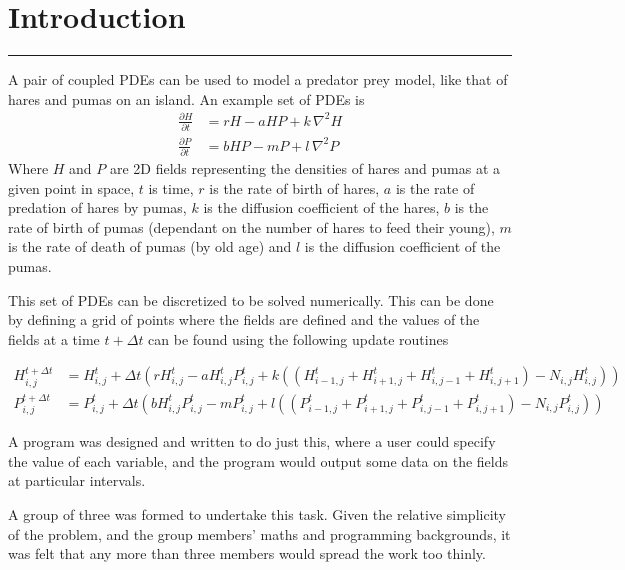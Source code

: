 \section{Introduction}
\vspace{-2em}\rule{\textwidth}{1pt}\vspace{1em}

A pair of coupled PDEs can be used to model a predator prey model, like
that of hares and pumas on an island.
An example set of PDEs is
\begin{align*}
  \frac{\partial{H}}{\partial{t}} &= rH - aHP + k\,{\nabla^2}H \\
  \frac{\partial{P}}{\partial{t}} &= bHP - mP + l\,{\nabla^2}P
\end{align*}
Where $H$ and $P$ are 2D fields representing the densities of hares and pumas
at a given point in space,
$t$ is time,
$r$ is the rate of birth of hares,
$a$ is the rate of predation of hares by pumas,
$k$ is the diffusion coefficient of the hares,
$b$ is the rate of birth of pumas (dependant on the number of hares to
    feed their young),
$m$ is the rate of death of pumas (by old age) and
$l$ is the diffusion coefficient of the pumas.

This set of PDEs can be discretized to be solved numerically.
This can be done by defining a grid of points where the fields are
defined and the values of the fields at a time $t + \Delta{t}$ can
be found using the following update routines

\begin{align*}
  H^{t+\Delta{t}}_{i,j} &= H^{t}_{i,j}
       + \Delta{t}(
           rH^{t}_{i,j} - a H^{t}_{i,j} P^{t}_{i,j}
           + k (
             (H^{t}_{i-1,j} + H^{t}_{i+1,j} + H^{t}_{i,j-1} + H^{t}_{i,j+1})
             -N_{i,j} H^{t}_{i,j}
           )
         ) \\
%
  P^{t+\Delta{t}}_{i,j} &= P^{t}_{i,j}
       + \Delta{t}(
           b H^{t}_{i,j} P^{t}_{i,j} - mP^{t}_{i,j}
           + l (
             (P^{t}_{i-1,j} + P^{t}_{i+1,j} + P^{t}_{i,j-1} + P^{t}_{i,j+1})
             -N_{i,j} P^{t}_{i,j}
           )
         )
\end{align*}

A program was designed and written to do just this, where a user could
specify the value of each variable, and the program would output some
data on the fields at particular intervals.

A group of three was formed to undertake this task.
Given the relative simplicity of the problem, and the group members'
maths and programming backgrounds, it was felt that any more than three
members would spread the work too thinly.
